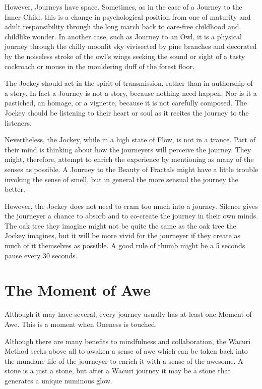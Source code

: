 \documentclass[12pt]{book}
\begin{document}
However, Journeys have space. Sometimes, as in the case of a Journey to the Inner Child,
this is a change in psychological position from one of maturity and adult responsibility through the long march back to care-free childhood and childlike wonder.
In another case, such as Journey to an Owl, it is a physical journey through the chilly moonlit sky vivisected by pine branches and decorated by the noiseless stroke of the owl’s wings seeking the sound or sight of a tasty cockroach or mouse in the mouldering duff of the forest floor.
					
The Jockey should act in the spirit of transmission, rather than in authorship of a story. In fact a Journey is not a story, because nothing need happen. Nor is it a pastiched, an homage, or a vignette, because it is not carefully composed.
The Jockey should be listening to their heart or soul as it recites the journey to the listeners.
					
Nevertheless, the Jockey, while in a high state of Flow, is not in a trance. Part of their mind is thinking about how the journeyers will perceive the journey. They might, therefore, attempt to enrich the experience by mentioning as many of the senses as possible. A Journey to the Beauty of Fractals might have a little trouble invoking the sense of smell, but in general the more sensual the journey the better.
					
However, the Jockey does not need to cram too much into a journey. Silence gives the journeyer a chance to absorb and to co-create the journey in their own minds. The oak tree they imagine might not be quite the same as the oak tree the Jockey imagines, but it will be more vivid for the journeyer if they create as much of it themselves as possible. A good rule of thumb might be a 5 seconds pause every 30 seconds.
					
\section{The Moment of Awe}
					
Although it may have several, every journey usually has at least one Moment of Awe. This is a moment when Oneness is touched.
					
Although there are many benefits to mindfulness and collaboration, the Wacuri Method seeks above all to awaken a sense of awe which can be taken back into the mundane life of the journeyer to enrich it with a sense of the awesome. A stone is a just a stone, but after a Wacuri journey it may be a stone that generates a unique numinous glow.
					
\end{document}
